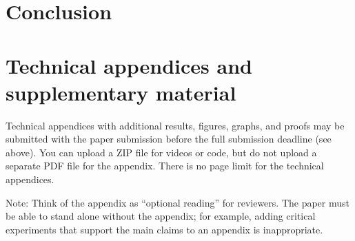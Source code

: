 \documentclass{article}
\begin{document}
\section{Conclusion}

\newpage


\newpage







\appendix

\section{Technical appendices and supplementary material}
Technical appendices with additional results, figures, graphs, and proofs may be submitted with the paper submission before the full submission deadline (see above). You can upload a ZIP file for videos or code, but do not upload a separate PDF file for the appendix. There is no page limit for the technical appendices. 

Note: Think of the appendix as ``optional reading'' for reviewers. The paper must be able to stand alone without the appendix; for example, adding critical experiments that support the main claims to an appendix is inappropriate. 


% 
\end{document}
